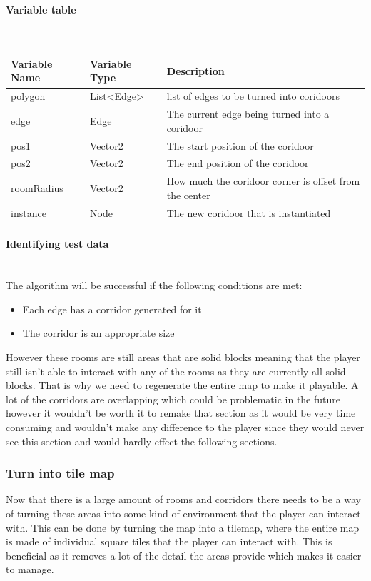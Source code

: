 \documentclass{article}
\newcommand{\myparagraph}[1]{\paragraph{#1}\mbox{}\\} %
\newcommand{\smallBr}{\vspace{1.5mm}}
\begin{document}
\myparagraph{Variable table}
\smallBr
\begin{tabular}{l|l|l}
Variable Name & Variable Type                     & Description                                            \\ \hline
polygon       & List\textless{}Edge\textgreater{} & list of edges to be turned into coridoors              \\
edge          & Edge                              & The current edge being turned into a coridoor          \\
pos1          & Vector2                           & The start position of the coridoor                     \\
pos2          & Vector2                           & The end position of the coridoor                       \\
roomRadius    & Vector2                           & How much the coridoor corner is offset from the center \\
instance      & Node                              & The new coridoor that is instantiated                 
\end{tabular}

\myparagraph{Identifying test data}
The algorithm will be successful if the following conditions are met:
\begin{itemize}
\item{Each edge has a corridor generated for it}
\item{The corridor is an appropriate size}
\end{itemize}

However these rooms are still areas  that are solid blocks meaning that the player still isn't able to interact with any of the rooms as they are currently all solid blocks. That is why we need to regenerate the entire map to make it playable. A lot of the corridors are overlapping which could be problematic in the future however it wouldn't be worth it to remake that section as it would be very time consuming and wouldn't make any difference to the player since they would never see this section and would hardly effect the following sections.



\subsubsection{Turn into tile map}
Now that there is a large amount of rooms and corridors there needs to be a way of turning these areas into some kind of environment that the player can interact with. This can be done by turning the map into a tilemap, where the entire map is made of individual square tiles that the player can interact with. This is beneficial as it removes a lot of the detail the areas provide which makes it easier to manage. 
\end{document}
